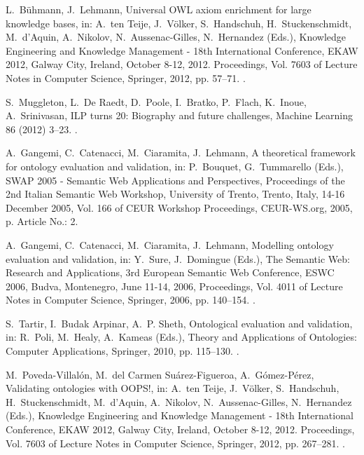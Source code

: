 \documentclass[review]{elsarticle}
\theoremstyle{definition}
\begin{document}
\begin{thebibliography}{10}
L.~B{\"u}hmann, J.~Lehmann, Universal {OWL} axiom enrichment for large
  knowledge bases, in: A.~ten Teije, J.~V{\"o}lker, S.~Handschuh,
  H.~Stuckenschmidt, M.~d'Aquin, A.~Nikolov, N.~Aussenac-Gilles, N.~Hernandez
  (Eds.), Knowledge Engineering and Knowledge Management - 18th International
  Conference, EKAW 2012, Galway City, Ireland, October 8-12, 2012. Proceedings,
  Vol. 7603 of Lecture Notes in Computer Science, Springer, 2012, pp. 57--71.
\newblock \href {http://dx.doi.org/10.1007/978-3-642-33876-2_8}
  {}.

S.~Muggleton, L.~{De Raedt}, D.~Poole, I.~Bratko, P.~Flach, K.~Inoue,
  A.~Srinivasan, {ILP} turns 20: Biography and future challenges, Machine
  Learning 86 (2012) 3--23.
\newblock \href {http://dx.doi.org/10.1007/s10994-011-5259-2}
  {}.

A.~Gangemi, C.~Catenacci, M.~Ciaramita, J.~Lehmann, A theoretical framework for
  ontology evaluation and validation, in: P.~Bouquet, G.~Tummarello (Eds.),
  SWAP 2005 - Semantic Web Applications and Perspectives, Proceedings of the
  2nd Italian Semantic Web Workshop, University of Trento, Trento, Italy, 14-16
  December 2005, Vol. 166 of CEUR Workshop Proceedings, CEUR-WS.org, 2005, p.
  Article No.: 2.

A.~Gangemi, C.~Catenacci, M.~Ciaramita, J.~Lehmann, Modelling ontology
  evaluation and validation, in: Y.~Sure, J.~Domingue (Eds.), The Semantic Web:
  Research and Applications, 3rd European Semantic Web Conference, ESWC 2006,
  Budva, Montenegro, June 11-14, 2006, Proceedings, Vol. 4011 of Lecture Notes
  in Computer Science, Springer, 2006, pp. 140--154.
\newblock \href {http://dx.doi.org/10.1007/11762256_13}
  {}.

S.~Tartir, I.~{Budak Arpinar}, A.~P. Sheth, Ontological evaluation and
  validation, in: R.~Poli, M.~Healy, A.~Kameas (Eds.), Theory and Applications
  of Ontologies: Computer Applications, Springer, 2010, pp. 115--130.
\newblock \href {http://dx.doi.org/10.1007/978-90-481-8847-5_5}
  {}.

M.~Poveda-Villal{\'o}n, M.~del Carmen Su{\'a}rez-Figueroa,
  A.~G{\'o}mez-P{\'e}rez, Validating ontologies with {OOPS}!, in: A.~ten Teije,
  J.~V{\"o}lker, S.~Handschuh, H.~Stuckenschmidt, M.~d'Aquin, A.~Nikolov,
  N.~Aussenac-Gilles, N.~Hernandez (Eds.), Knowledge Engineering and Knowledge
  Management - 18th International Conference, EKAW 2012, Galway City, Ireland,
  October 8-12, 2012. Proceedings, Vol. 7603 of Lecture Notes in Computer
  Science, Springer, 2012, pp. 267--281.
\newblock \href {http://dx.doi.org/10.1007/978-3-642-33876-2_24}
  {}.


\end{thebibliography}
\end{document}
